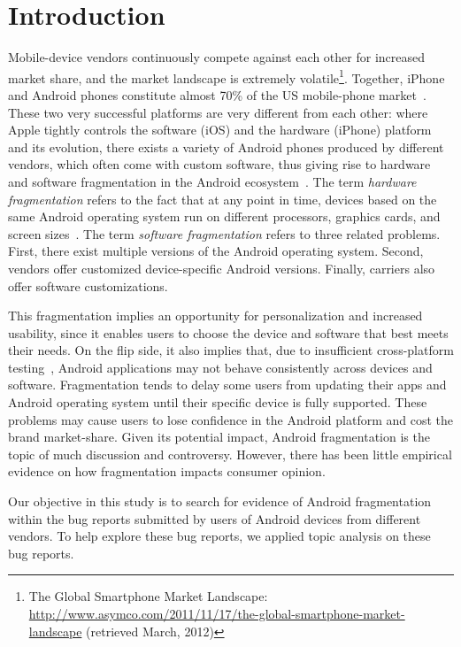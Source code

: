 \documentclass[10pt, conference, compsocconf]{IEEEtran}
\begin{document}
\section{Introduction}

Mobile-device vendors continuously compete against each other for
increased market share, and the market landscape is extremely
volatile\footnote{The Global Smartphone Market Landscape:
  \url{http://www.asymco.com/2011/11/17/the-global-smartphone-market-landscape}
  (retrieved March, 2012)}. Together, iPhone and Android phones
constitute almost 70\% of the US mobile-phone market~\cite{usmarket}. 
These two very successful platforms are very
different from each other: where Apple tightly controls the software
(iOS) and the hardware (iPhone) platform and its evolution, there
exists a variety of Android phones produced by different vendors, which
often come with custom software, thus giving rise to hardware and
software fragmentation in the Android ecosystem~\cite{analysis}. The
term {\em hardware fragmentation} refers to the fact that at any point
in time, devices based on the same Android operating system run on
different processors, graphics cards, and screen
sizes~\cite{analysis}. 
The term {\em software fragmentation} refers to three
related problems. First, there exist multiple versions of the Android
operating system. Second, vendors offer customized device-specific
Android versions. Finally, carriers also offer software
customizations.

This fragmentation implies an opportunity for personalization and
increased usability, since it enables users to choose the device and
software that best meets their needs. On the flip side, it also
implies that, due to insufficient cross-platform
testing~\cite{testing}, Android applications may not behave
consistently across devices and software.  
Fragmentation tends to delay some users from updating their apps
and Android operating system until their specific device is fully supported.
These problems
may cause users to lose confidence in the Android platform and cost
the brand market-share. Given its potential impact, Android
fragmentation is the topic of much discussion and
controversy. However, there has been little empirical evidence on how
fragmentation impacts consumer opinion.

Our objective in this study is to search for evidence of Android
fragmentation within the bug reports submitted by users of Android
devices from different vendors. To help explore these bug reports, we
applied topic analysis on these bug reports.
\end{document}
